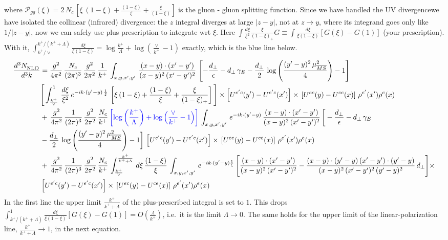 \documentclass[10pt]{article}
\newcommand{\new}[1]{{\color{blue}#1}}
\newcommand{\old}[1]{{\color{red}#1}}
\begin{document}
where $\mathcal{P}_{gg}(\xi) = 2\,N_{c}\,\left[\xi\,(1-\xi)+\frac{(1-\xi)}{\xi}+\frac{\xi}{(1-\xi)}\right]$ is the gluon - gluon splitting function. Since \old{we have handled the UV divergence}\new{we have isolated the collinear (infrared) divergence: the $z$ integral diverges at large $|z-y|$, not at $z\to y$, where its integrand goes only like $1/|z-y|$}, now we can safely use plus prescription to integrate wrt $\xi$. \new{Here $\int\frac{d\xi}{\xi^2}\frac{\xi}{(1-\xi)_+}G\equiv\int\frac{d\xi}{\xi(1-\xi)}[G(\xi)-G(1)]$ (your prescription). With it, $\int_{k^+/\vee}^{k^+/(k^++\Lambda)}\frac{d\xi}{\xi(1-\xi)}=\log\frac{k^+}{\Lambda}+\log(\frac{\vee}{k^+}-1)$ exactly, which is the blue line below.} 
\begin{align}
    \frac{d^{3}N_{\rm NLO}^{\rm}}{d^{3}k}  & = \frac{g^{2}}{4\pi^{2}}\, \frac{N_{c}}{(2\pi)^{3}}\,\frac{g^{2}}{2\pi^{2}}\, \frac{1}{k^{+}}\,\int_{x,y,x',y'}\,\frac{(x-y)\cdot (x'-y')}{(x-y)^{2}\,(x'-y')^{2}}\,\left[-\frac{d_{\perp}}{\epsilon}-d_{\perp}\,\gamma_{E}-\frac{d_{\perp}}{2}\,\log{\left(\frac{(y'-y)^{2}\,\mu^{2}_{\overline{MS}}}{4}\right)}-1\right]\,\notag \\ & \Bigg[\int_{\frac{k^{+}}{\vee}}^{1}\,\frac{d\xi}{\xi^{2}}\,e^{-ik\cdot (y'-y)\,\frac{1}{\xi}}\,\left[\xi\,(1-\xi)+\frac{(1-\xi)}{\xi}+\frac{\xi}{(1-\xi)_{+}}\right]\Bigg]\times \left[U^{e'c}(y') - U^{e'c}(x')\right] \times\, \left[U^{ec}(y) - U^{ce}(x)\right]\, \rho^{e'}(x') \rho^{e}(x)\notag \\ &  +\, \frac{g^{2}}{4\pi^{2}}\, \frac{1}{(2\pi)^{3}}\,\frac{g^{2}}{2\pi^{2}}\, \frac{N_{c}}{k^{+}}\,{\color{blue}\left[\log{\left(\frac{k^{+}}{\Lambda}\right)}+\log{\left(\frac{\vee}{k^{+}}-1\right)}\right]}\,\int_{x,y,x',y'}\,e^{-ik\cdot (y'-y)}\,\frac{(x-y)\cdot (x'-y')}{(x-y)^{2}\,(x'-y')^{2}}\,\bigg[-\frac{d_{\perp}}{\epsilon}-d_{\perp}\,\gamma_{E}\notag \\ & -\frac{d_{\perp}}{2}\,\log{\left(\frac{(y'-y)^{2}\,\mu^{2}_{\overline{MS}}}{4}\right)}-1\bigg]\,\left[U^{e'c}(y') - U^{e'c}(x')\right] \times\, \left[U^{ec}(y) - U^{ce}(x)\right]\, \rho^{e'}(x') \rho^{e}(x)\notag \\ & +\,\frac{g^{2}}{4\pi^{2}}\, \frac{1}{(2\pi)^{3}}\,\frac{g^{2}}{2\pi^{2}}\, \frac{N_{c}}{k^{+}}\,\int_{\frac{k^{+}}{\vee}}^{\frac{k^{+}}{k^{+}+\Lambda}}\,d\xi\, \frac{(1-\xi)}{\xi}\, \int_{x,y,x',y'}\,e^{-ik\cdot (y'-y)\frac{1}{\xi}}\,\Bigg[\frac{(x-y)\cdot (x'-y')}{(x-y)^{2}\, (x'-y')^{2}} -\frac{(x-y)\cdot (y'-y)\, (x'-y')\cdot (y'-y)}{(x-y)^{2}\,(x'-y')^{2}\,(y'-y)^{2}}\,d_{\perp}\Bigg]\times\notag \\ &  \left[U^{e'c}(y') - U^{e'c}(x')\right] \times\, \left[U^{ec}(y) - U^{ce}(x)\right]\, \rho^{e'}(x') \rho^{e}(x)
\end{align}
\new{\noindent In the first line the upper limit $\frac{k^+}{k^++\Lambda}$ of the plus-prescribed integral is set to $1$. This drops $\int_{k^+/(k^++\Lambda)}^{1}\frac{d\xi}{\xi(1-\xi)}[G(\xi)-G(1)]=O(\frac{\Lambda}{k^+})$, i.e.\ it is the limit $\Lambda\to0$. The same holds for the upper limit of the linear-polarization line, $\frac{k^+}{k^++\Lambda}\to1$, in the next equation.}
\end{document}
